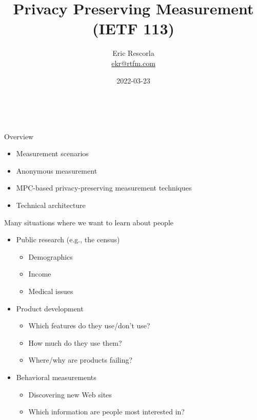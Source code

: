 \documentclass[helvetica]{beamer}
\title{Privacy Preserving Measurement (IETF 113)}
\author{Eric Rescorla \\\url{ekr@rtfm.com}}
\date{2022-03-23}
\begin{document}
\begin{frame}
  \titlepage
\end{frame}

\begin{frame}{Overview}
  \begin{itemize}
  \item Measurement scenarios
  \item Anonymous measurement
  \item MPC-based privacy-preserving measurement techniques
  \item Technical architecture
  \end{itemize}
\end{frame}

  
\begin{frame}{Many situations where we want to learn about people}

  \begin{itemize}
  \item Public research (e.g., the census)
    \begin{itemize}
    \item Demographics
    \item Income
    \item Medical issues
    \end{itemize}
    
  \item Product development
    \begin{itemize}
    \item Which features do they use/don't use?
    \item How much do they use them?
    \item Where/why are products failing?      
    \end{itemize}
    
  \item Behavioral measurements
    \begin{itemize}
    \item Discovering new Web sites
    \item Which information are people most interested in?
    \end{itemize}
  \end{itemize}
\end{frame}
\end{document}
